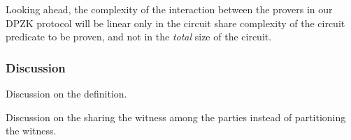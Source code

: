 Looking ahead, the complexity of the interaction between the provers in our DPZK protocol will be linear only in the circuit share complexity of the circuit predicate to be proven, and not in the \textit{total} size of the circuit. 
 
\subsubsection{Discussion}
Discussion on the definition.

Discussion on the sharing the witness among the parties instead of partitioning the witness.

%
%
